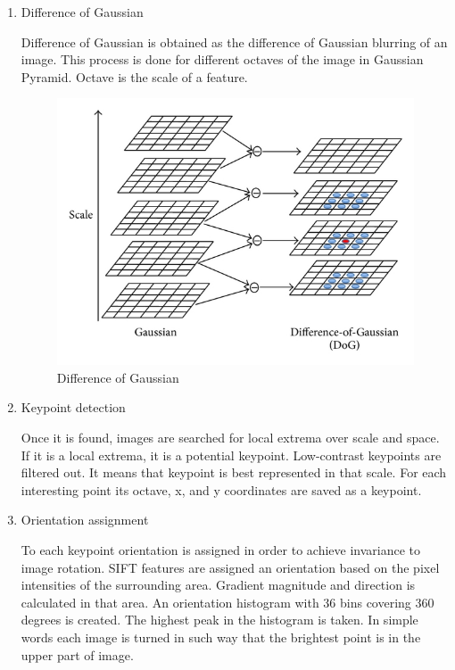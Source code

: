 \documentclass[a4paper, 11pt]{article}
\begin{document}
\begin{enumerate}

\item Difference of Gaussian

Difference of Gaussian is obtained as the difference of Gaussian blurring of an image. This process is done for different octaves of the image in Gaussian Pyramid. Octave is the scale of a feature.

\begin{figure}[!htbp]
\includegraphics[scale=2.2]{The-process-of-local-extrema-detection-based-on-Difference-of-Gaussian-DoG.png}
\centering
\caption{Difference of Gaussian}
\end{figure}


\item Keypoint detection

Once it is found, images are searched for local extrema over scale and space. If it is a local extrema, it is a potential keypoint. Low-contrast keypoints are filtered out. It means that keypoint is best represented in that scale. For each interesting point its octave, x, and y coordinates are saved as a keypoint. 

\item Orientation assignment

To each keypoint orientation is assigned in order to achieve invariance to image rotation. SIFT features are assigned an orientation based on the pixel intensities of the surrounding area. Gradient magnitude and direction is calculated in that area. An orientation histogram with 36 bins covering 360 degrees is created. The highest peak in the histogram is taken. In simple words each image is turned in such way that the brightest point is in the upper part of image.


\end{enumerate}
\end{document}
